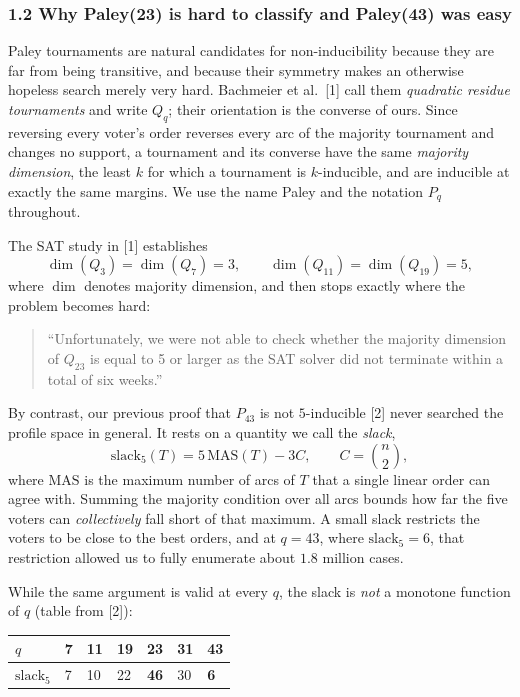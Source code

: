 \documentclass[
]{article}
\newcounter{none} %
\begin{document}
\subsubsection{1.2 Why Paley(23) is hard to classify and Paley(43) was
easy}\label{why-paley23-is-hard-to-classify-and-paley43-was-easy}

Paley tournaments are natural candidates for non-inducibility because
they are far from being transitive, and because their symmetry makes an
otherwise hopeless search merely very hard. Bachmeier et al.~{[}1{]}
call them \emph{quadratic residue tournaments} and write \(Q_q\); their
orientation is the converse of ours. Since reversing every voter's order
reverses every arc of the majority tournament and changes no support, a
tournament and its converse have the same \emph{majority dimension}, the
least \(k\) for which a tournament is \(k\)-inducible, and are inducible
at exactly the same margins. We use the name Paley and the notation
\(P_q\) throughout.

The SAT study in {[}1{]} establishes
\[\dim(Q_3) = \dim(Q_7) = 3, \qquad \dim(Q_{11}) = \dim(Q_{19}) = 5,\]
where \(\dim\) denotes majority dimension, and then stops exactly where
the problem becomes hard:

\begin{quote}
``Unfortunately, we were not able to check whether the majority
dimension of \(Q_{23}\) is equal to 5 or larger as the SAT solver did
not terminate within a total of six weeks.''
\end{quote}

By contrast, our previous proof that \(P_{43}\) is not \(5\)-inducible
{[}2{]} never searched the profile space in general. It rests on a
quantity we call the \emph{slack},
\[\mathrm{slack}_5(T) = 5\,\mathrm{MAS}(T) - 3C, \qquad C = \binom{n}{2},\]
where \(\mathrm{MAS}\) is the maximum number of arcs of \(T\) that a
single linear order can agree with. Summing the majority condition over
all arcs bounds how far the five voters can \emph{collectively} fall
short of that maximum. A small slack restricts the voters to be close to
the best orders, and at \(q = 43\), where \(\mathrm{slack}_5 = 6\), that
restriction allowed us to fully enumerate about \(1.8\) million cases.

While the same argument is valid at every \(q\), the slack is \emph{not}
a monotone function of \(q\) (table from {[}2{]}):

{\def\LTcaptype{none} %
\begin{longtable}[]{@{}lllllll@{}}
\toprule\noalign{}
\(q\) & 7 & 11 & 19 & 23 & 31 & 43 \\
\midrule\noalign{}
\endhead
\bottomrule\noalign{}
\endlastfoot
\(\mathrm{slack}_5\) & 7 & 10 & 22 & \textbf{46} & 30 & \textbf{6} \\
\end{longtable}
}
\end{document}

